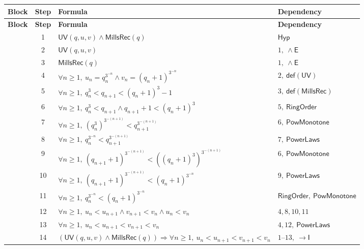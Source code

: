 \documentclass[11pt,reqno]{amsart}
\theoremstyle{blueplain}
\numberwithin{equation}{section}
\begin{document}
{\begin{longtable}{|p{3cm}|c|p{10cm}|p{4cm}|}
\hline	\label{tab:all-proofs}
\textbf{Block} & \textbf{Step} & \textbf{Formula} & \textbf{Dependency}\\
	\hline
	\endfirsthead
	\hline
	\textbf{Block} & \textbf{Step} & \textbf{Formula} & \textbf{Dependency}\\
	\hline
	\endhead
	\hline
	\endfoot
	\multirow{14}{*}{$\mathsf{MillsMono}$} &
	1 & $\mathsf{UV}(q,u,v)\wedge\mathsf{MillsRec}(q)$ & $\mathsf{Hyp}$\\
	\cline{2-4}
	& 2 & $\mathsf{UV}(q,u,v)$ & $1,\ \wedge\mathsf{E}$\\
	\cline{2-4}
	& 3 & $\mathsf{MillsRec}(q)$ & $1,\ \wedge\mathsf{E}$\\
	\cline{2-4}
	& 4 & $\forall n\ge1,\ u_n=q_n^{3^{-n}}\wedge v_n=(q_n+1)^{3^{-n}}$ & $2,\ \mathsf{def}(\mathsf{UV})$\\
	\cline{2-4}
	& 5 & $\forall n\ge1,\ q_n^3<q_{n+1}<(q_n+1)^3-1$ & $3,\ \mathsf{def}(\mathsf{MillsRec})$\\
	\cline{2-4}
	& 6 & $\forall n\ge1,\ q_n^3<q_{n+1}\wedge q_{n+1}+1<(q_n+1)^3$ & $5,\ \mathsf{RingOrder}$\\
	\cline{2-4}
	& 7 & $\forall n\ge1,\ (q_n^3)^{3^{-(n+1)}}<q_{n+1}^{3^{-(n+1)}}$ & $6,\ \mathsf{PowMonotone}$\\
	\cline{2-4}
	& 8 & $\forall n\ge1,\ q_n^{3^{-n}}<q_{n+1}^{3^{-(n+1)}}$ & $7,\ \mathsf{PowerLaws}$\\
	\cline{2-4}
	& 9 & $\forall n\ge1,\ (q_{n+1}+1)^{3^{-(n+1)}}<((q_n+1)^3)^{3^{-(n+1)}}$ & $6,\ \mathsf{PowMonotone}$\\
	\cline{2-4}
	& 10 & $\forall n\ge1,\ (q_{n+1}+1)^{3^{-(n+1)}}<(q_n+1)^{3^{-n}}$ & $9,\ \mathsf{PowerLaws}$\\
	\cline{2-4}
	& 11 & $\forall n\ge1,\ q_n^{3^{-n}}<(q_n+1)^{3^{-n}}$ & $\mathsf{RingOrder},\ \mathsf{PowMonotone}$\\
	\cline{2-4}
	& 12 & $\forall n\ge1,\ u_n<u_{n+1}\wedge v_{n+1}<v_n\wedge u_n<v_n$ & $4,8,10,11$\\
	\cline{2-4}
	& 13 & $\forall n\ge1,\ u_n<u_{n+1}<v_{n+1}<v_n$ & $4,12,\ \mathsf{PowerLaws}$\\
	\cline{2-4}
	& 14 & $(\mathsf{UV}(q,u,v)\wedge\mathsf{MillsRec}(q))\Rightarrow\forall n\ge1,\ u_n<u_{n+1}<v_{n+1}<v_n$ & $1\text{--}13,\ \rightarrow\mathsf{I}$\\
	\hline
	

\end{longtable}}
\end{document}
